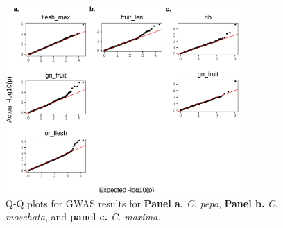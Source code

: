 \documentclass[utf8]{frontiers_suppmat} %
\begin{document}
\clearpage

\begin{figure}[h]
	\begin{center}
		\includegraphics[width=0.8\textwidth]{../supplemental/03_subfig}%
	\end{center}
	\caption{Q-Q plots for GWAS results for \textbf{Panel a.} \textit{C. pepo}, \textbf{Panel b.} \textit{C. moschata}, and \textbf{panel c.} \textit{C. maxima.}\label{fig:2}}
\end{figure}

\newpage
\end{document}
